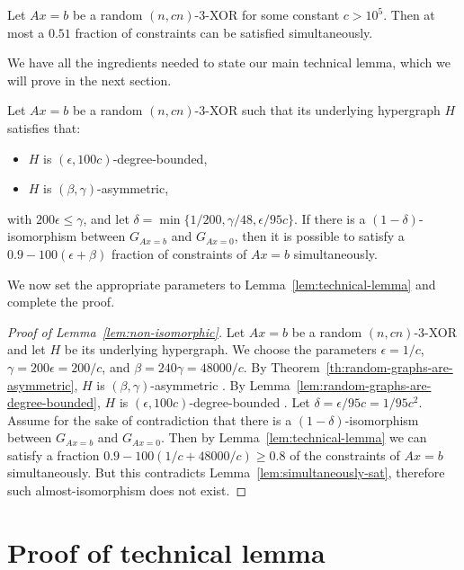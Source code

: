 \documentclass[a4paper,twoside,justified]{tufte-handout}
\newcommand{\Glin}[1]{G_{Ax=#1}}
\begin{document}
\begin{lemma}
  \label{lem:simultaneously-sat}
  Let $Ax=b$ be a random $(n,cn)$-3-XOR for some constant $c > 10^5$. Then \whp at most a $0.51$ fraction of constraints can be satisfied simultaneously.
\end{lemma}

We have all the ingredients needed to state our main technical lemma, which we will prove in the next section.

\begin{lemma}
  \label{lem:technical-lemma}
  Let $Ax=b$ be a random $(n,cn)$-3-XOR such that its underlying hypergraph $H$ satisfies that:
  \begin{itemize}
  \item $H$ is $(\epsilon, 100c)$-degree-bounded,
  \item $H$ is $(\beta, \gamma)$-asymmetric,
  \end{itemize}
  with $200 \epsilon \leq \gamma$, and let $\delta = \min\{1/200, \gamma/48, \epsilon / 95c\}$. If there is a $(1-\delta)$-isomorphism between $\Glin{b}$ and $\Glin{0}$, then it is possible to satisfy a $0.9 - 100(\epsilon + \beta)$ fraction of constraints of $Ax=b$ simultaneously.
\end{lemma}

We now set the appropriate parameters to Lemma~\ref{lem:technical-lemma} and complete the proof.

\begin{proof}[Proof of Lemma~\ref{lem:non-isomorphic}]
  Let $Ax=b$ be a random $(n,cn)$-3-XOR and let $H$ be its underlying hypergraph. We choose the parameters $\epsilon = 1/c$, $\gamma = 200\epsilon = 200/c$, and $\beta = 240 \gamma = 48000/c$. By Theorem~\ref{th:random-graphs-are-asymmetric}, $H$ is $(\beta,\gamma)$-asymmetric \whp. By Lemma~\ref{lem:random-graphs-are-degree-bounded}, $H$ is $(\epsilon,100c)$-degree-bounded \whp. Let $\delta = \epsilon / 95c = 1/95c^2$. Assume for the sake of contradiction that there is a $(1-\delta)$-isomorphism between $\Glin{b}$ and $\Glin{0}$. Then by Lemma~\ref{lem:technical-lemma} we can satisfy a fraction $0.9-100(1/c+48000/c) \geq 0.8$ of the constraints of $Ax=b$ simultaneously. But this contradicts Lemma~\ref{lem:simultaneously-sat}, therefore such almost-isomorphism does not exist.
\end{proof}

\section{Proof of technical lemma}
\end{document}
